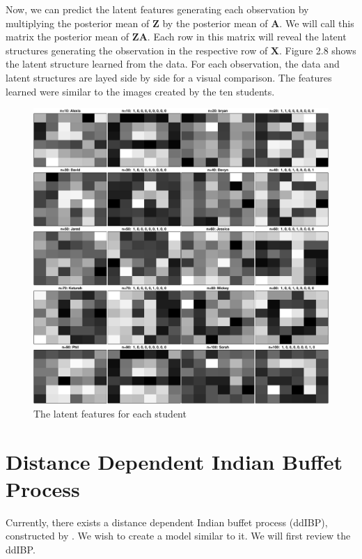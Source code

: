 \noindent
Now, we can predict the latent features generating each observation by
multiplying the posterior mean of $\bm Z$ by the posterior mean of $\bm A$. We
will call this matrix the posterior mean of $\bm {ZA}$. Each row in this matrix
will reveal the latent structures generating the observation in the respective
row of $\bm X$. Figure 2.8 shows the latent structure learned from the data. 
For each observation, the data and latent structures are layed side by side
for a visual comparison. The features learned were similar to the images
created by the ten students.


\begin{figure}\begin{center}
  \caption{The latent features for each student}
  \includegraphics[height=1\textwidth]{images/postFriends.pdf}
\end{center}\end{figure}


\section{Distance Dependent Indian Buffet Process}
Currently, there exists a distance dependent Indian buffet process (ddIBP), 
constructed by \cite{ddibp}. We wish to create a model 
similar to it. We will first review the ddIBP. \\

